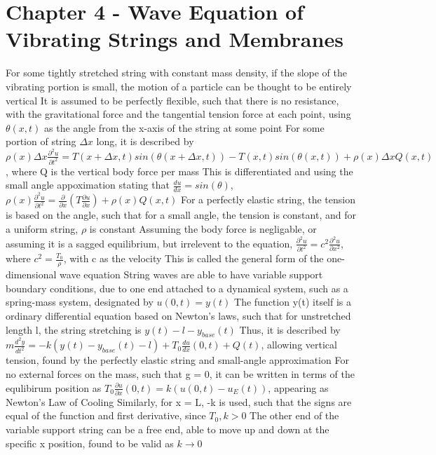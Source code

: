 \documentclass[11 pt, twoside]{article}
\newenvironment{outline*}
{
	\begin{outline}[enumerate]
	}
	{\end{outline}
}
\begin{document}
\section{Chapter 4 - Wave Equation of Vibrating Strings and Membranes}
\begin{outline*}
\1 For some tightly stretched string with constant mass density, if the slope of the vibrating portion is small, the motion of a particle can be thought to be entirely vertical
	\2 It is assumed to be perfectly flexible, such that there is no resistance, with the gravitational force and the tangential tension force at each point, using $\theta(x, t)$ as the angle from the x-axis of the string at some point
		\3 For some portion of string $\Delta x$ long, it is described by $\rho(x)\Delta x \frac{\partial^2 u}{\partial t^2} = T(x + \Delta x, t)sin(\theta(x + \Delta x, t)) - T(x, t)sin(\theta(x, t)) + \rho(x)\Delta x Q(x, t)$, where Q is the vertical body force per mass
		\3 This is differentiated and using the small angle appoximation stating that $\frac{du}{dx} = sin(\theta)$, $\rho(x)\frac{\partial^2 u}{\partial t^2} = \frac{\partial}{\partial x}(T\frac{\partial u}{\partial x}) + \rho(x)Q(x, t)$
	\2 For a perfectly elastic string, the tension is based on the angle, such that for a small angle, the tension is constant, and for a uniform string, $\rho$ is constant 
	\2 Assuming the body force is negligable, or assuming it is a sagged equilibrium, but irrelevent to the equation, $\frac{\partial^2 u}{\partial t^2} = c^2\frac{\partial^2 u}{\partial x^2}$, where $c^2 = \frac{T_0}{\rho}$, with c as the velocity
		\3 This is called the general form of the one-dimensional wave equation
\1 String waves are able to have variable support boundary conditions, due to one end attached to a dynamical system, such as a spring-mass system, designated by $u(0, t) = y(t)$
	\2 The function y(t) itself is a ordinary differential equation based on Newton's laws, such that for unstretched length l, the string stretching is $y(t) - l - y_{base}(t)$
	\2 Thus, it is described by $m\frac{d^2y}{dt^2} = -k(y(t) - y_{base}(t) - l) + T_0\frac{du}{dx}(0, t) + Q(t)$, allowing vertical tension, found by the perfectly elastic string and small-angle approximation
	\2 For no external forces on the mass, such that g = 0, it can be written in terms of the equlibirum position as $T_0\frac{\partial u}{\partial x}(0, t) = k(u(0, t) - u_E(t))$, appearing as Newton's Law of Cooling
		\3 Similarly, for x = L, -k is used, such that the signs are equal of the function and first derivative, since $T_0, k > 0$
	\2 The other end of the variable support string can be a free end, able to move up and down at the specific x position, found to be valid as $k \to 0$

\end{outline*}
\end{document}
